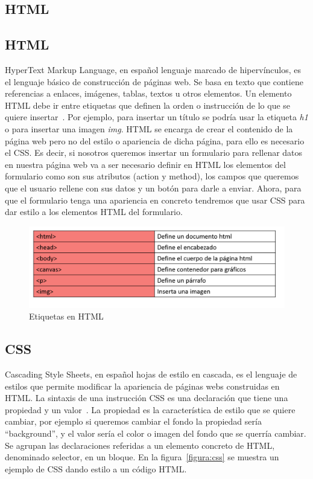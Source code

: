 \documentclass[a4paper, 12pt]{book}
\begin{document}
\subsection{HTML}
\subsection{HTML}
HyperText Markup Language, en español lenguaje marcado de hipervínculos, es el lenguaje básico de construcción de páginas web. Se basa en texto que contiene referencias a enlaces, imágenes, tablas, textos u otros elementos. Un elemento HTML debe ir entre etiquetas que definen la orden o instrucción de lo que se quiere insertar~\cite{equipo2009diseno}. Por ejemplo, para insertar un título se podría usar la etiqueta \textit{h1} o para insertar una imagen \textit{img}. HTML se encarga de crear el contenido de la página web pero no del estilo o apariencia de dicha página, para ello es necesario el CSS. Es decir, si nosotros queremos insertar un formulario para rellenar datos en nuestra página web va a ser necesario definir en HTML los elementos del formulario como son sus atributos (action y method), los campos que queremos que el usuario rellene con sus datos y un botón para darle a enviar. Ahora, para que el formulario tenga una apariencia en concreto tendremos que usar CSS para dar estilo a los elementos HTML del formulario.

\begin{figure}[h]
        \centering
        \includegraphics[scale=0.6]{img/tags.PNG}
        \caption{Etiquetas en HTML}
        \label{figura:tags}
\end{figure}

\subsection{CSS}
Cascading Style Sheets, en español hojas de estilo en cascada, es el lenguaje de estilos que permite modificar la apariencia de páginas webs construidas en HTML. La sintaxis de una instrucción CSS es una declaración que tiene una propiedad y un valor~\cite{mdn}. La propiedad es la característica de estilo que se quiere cambiar, por ejemplo si queremos cambiar el fondo la propiedad sería ``background'', y el valor sería el color o imagen del fondo que se querría cambiar. Se agrupan las declaraciones referidas a un elemento concreto de HTML, denominado selector, en un bloque. En la figura~\ref{figura:css} se muestra un ejemplo de CSS dando estilo a un código HTML.
\end{document}
